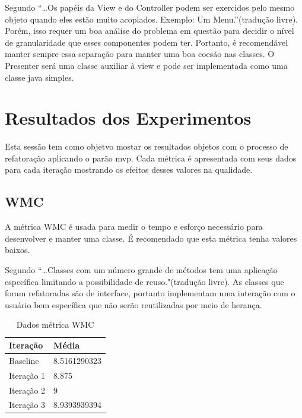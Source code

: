 Segundo  ``\ldots Os papéis da View e do
Controller podem ser exercidos pelo mesmo objeto quando eles estão muito
acoplados. Exemplo: Um Menu.''(tradução livre). Porém, isso requer um boa
análise do problema em questão para decidir o nível de granularidade que esses componentes podem ter.
Portanto, é recomendável manter sempre essa separação para manter uma boa coesão
nas classes. O Presenter será uma classe auxiliar à view e pode ser implementada
como uma classe java simples. 



\section{Resultados dos Experimentos}

Esta sessão tem como objetvo mostar os resultados objetos com o processo de
refatoração aplicando o parão mvp. Cada métrica é apresentada com seus dados
para cada iteração mostrando os efeitos desses valores na qualidade.


\subsection{WMC}


A métrica WMC é usada para medir o tempo e esforço necessário para desenvolver e
manter uma classe. É recomendado que esta métrica tenha valores baixos.

Segundo  “\ldots Classes com um número grande de métodos
tem uma aplicação específica limitando a possibilidade de reuso."(tradução
livre). As classes que foram refatoradas são de interface, portanto
implementam uma interação com o usuário bem específica que não serão
reutilizadas por meio de herança.
\begin{table}[h]
	\centering
    \begin{tabular}{ | l | l | }
    \hline
    Iteração & Média 			\\ \hline
    Baseline & 8.5161290323   	\\ \hline
    Iteração 1 & 8.875			\\ \hline
	Iteração 2 & 9				\\ \hline
	Iteração 3 & 8.9393939394	\\ \hline
    \end{tabular}
    \caption{Dados métrica WMC}
    \label{tab:wmc}
\end{table}


